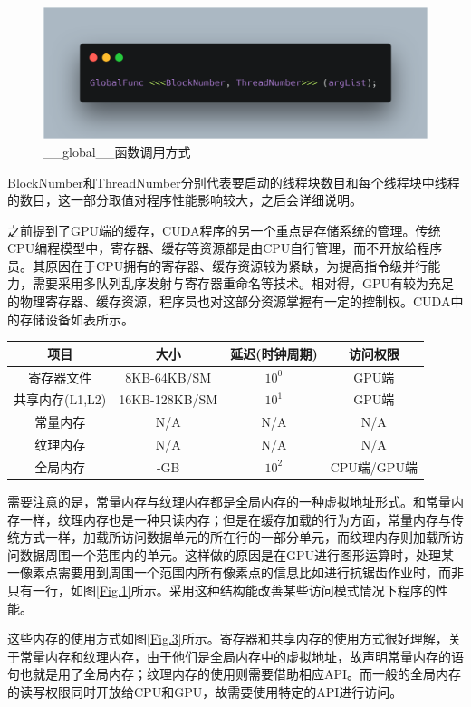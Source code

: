 \begin{figure}
	\centering
	\includegraphics[width=15cm]{figures/CODE3.png}
	\caption{\label{Fig.4} \_\_global\_\_函数调用方式}
\end{figure}
BlockNumber和ThreadNumber分别代表要启动的线程块数目和每个线程块中线程的数目，这一部分取值对程序性能影响较大，之后会详细说明。

\par 之前提到了GPU端的缓存，CUDA程序的另一个重点是存储系统的管理。传统CPU编程模型中，寄存器、缓存等资源都是由CPU自行管理，而不开放给程序员。其原因在于CPU拥有的寄存器、缓存资源较为紧缺，为提高指令级并行能力，需要采用多队列乱序发射与寄存器重命名等技术。相对得，GPU有较为充足的物理寄存器、缓存资源，程序员也对这部分资源掌握有一定的控制权\parencite{CUDAPROG}。CUDA中的存储设备如表所示。
\begin{center}
	\begin{tabular}{cccc}
		\toprule
		项目				&	大小			&	延迟(时钟周期)	&	访问权限	\\
		\midrule
		寄存器文件		&	8KB-64KB/SM		&	$ 10^0 $	& GPU端	\\
		共享内存(L1,L2)	&	16KB-128KB/SM	&	$ 10^1 $	&	GPU端\\
		常量内存		&	N/A				&	N/A		&	N/A	\\
		纹理内存		&	N/A				&	N/A		&	N/A \\
		全局内存		&	-GB				&	$ 10^2 $	&	CPU端/GPU端 \\
		\bottomrule
	\end{tabular}
\end{center}
\par 需要注意的是，常量内存与纹理内存都是全局内存的一种虚拟地址形式。和常量内存一样，纹理内存也是一种只读内存；但是在缓存加载的行为方面，常量内存与传统方式一样，加载所访问数据单元的所在行的一部分单元，而纹理内存则加载所访问数据周围一个范围内的单元\parencite{THEDESIGN}。这样做的原因是在GPU进行图形运算时，处理某一像素点需要用到周围一个范围内所有像素点的信息比如进行抗锯齿作业时，而非只有一行，如图\ref{Fig.1}所示。采用这种结构能改善某些访问模式情况下程序的性能。
\par 这些内存的使用方式如图\ref{Fig.3}所示。寄存器和共享内存的使用方式很好理解，关于常量内存和纹理内存，由于他们是全局内存中的虚拟地址，故声明常量内存的语句也就是用了全局内存；纹理内存的使用则需要借助相应API。而一般的全局内存的读写权限同时开放给CPU和GPU，故需要使用特定的API进行访问。
